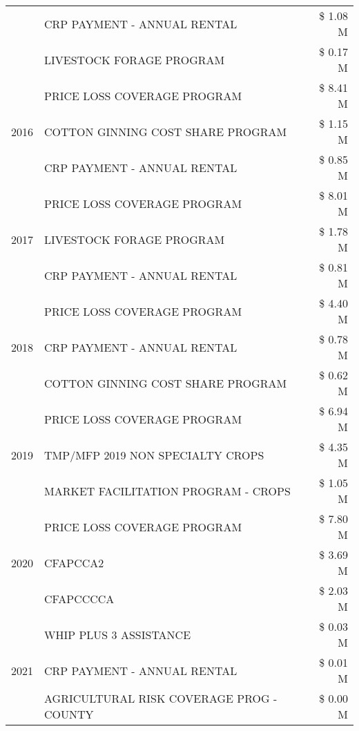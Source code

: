 \begin{tabular}{llr}
 & CRP PAYMENT - ANNUAL RENTAL & \$ 1.08 M \\
 & LIVESTOCK FORAGE PROGRAM & \$ 0.17 M \\
\cline{1-3}
\multirow[t]{3}{*}{2016} & PRICE LOSS COVERAGE PROGRAM                   & \$ 8.41 M \\
 & COTTON GINNING COST SHARE PROGRAM             & \$ 1.15 M \\
 & CRP PAYMENT - ANNUAL RENTAL                   & \$ 0.85 M \\
\cline{1-3}
\multirow[t]{3}{*}{2017} & PRICE LOSS COVERAGE PROGRAM & \$ 8.01 M \\
 & LIVESTOCK FORAGE PROGRAM & \$ 1.78 M \\
 & CRP PAYMENT - ANNUAL RENTAL & \$ 0.81 M \\
\cline{1-3}
\multirow[t]{3}{*}{2018} & PRICE LOSS COVERAGE PROGRAM & \$ 4.40 M \\
 & CRP PAYMENT - ANNUAL RENTAL & \$ 0.78 M \\
 & COTTON GINNING COST SHARE PROGRAM & \$ 0.62 M \\
\cline{1-3}
\multirow[t]{3}{*}{2019} & PRICE LOSS COVERAGE PROGRAM & \$ 6.94 M \\
 & TMP/MFP 2019 NON SPECIALTY CROPS & \$ 4.35 M \\
 & MARKET FACILITATION PROGRAM - CROPS & \$ 1.05 M \\
\cline{1-3}
\multirow[t]{3}{*}{2020} & PRICE LOSS COVERAGE PROGRAM & \$ 7.80 M \\
 & CFAPCCA2 & \$ 3.69 M \\
 & CFAPCCCCA & \$ 2.03 M \\
\cline{1-3}
\multirow[t]{3}{*}{2021} & WHIP PLUS 3 ASSISTANCE & \$ 0.03 M \\
 & CRP PAYMENT - ANNUAL RENTAL & \$ 0.01 M \\
 & AGRICULTURAL RISK COVERAGE PROG - COUNTY & \$ 0.00 M \\
\cline{1-3}
\bottomrule
\end{tabular}
